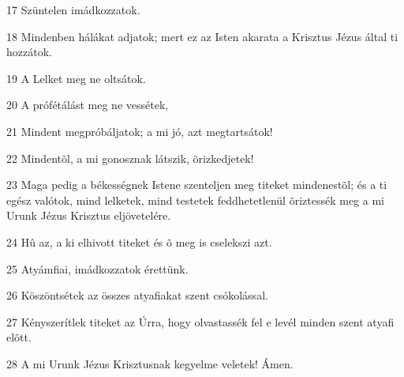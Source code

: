 \par 17 Szüntelen imádkozzatok.
\par 18 Mindenben hálákat adjatok; mert ez az Isten akarata a Krisztus Jézus által ti hozzátok.
\par 19 A Lelket meg ne oltsátok.
\par 20 A prófétálást meg ne vessétek,
\par 21 Mindent megpróbáljatok; a mi jó, azt megtartsátok!
\par 22 Mindentõl, a mi gonosznak látszik, õrizkedjetek!
\par 23 Maga pedig a békességnek Istene szenteljen meg titeket mindenestõl; és a ti egész valótok, mind lelketek, mind testetek feddhetetlenül õriztessék meg a mi Urunk Jézus Krisztus eljövetelére.
\par 24 Hû az, a ki elhivott titeket és õ meg is cselekszi azt.
\par 25 Atyámfiai, imádkozzatok érettünk.
\par 26 Köszöntsétek az összes atyafiakat szent csókolással.
\par 27 Kényszerítlek titeket az Úrra, hogy olvastassék fel e levél minden szent atyafi elõtt.
\par 28 A mi Urunk Jézus Krisztusnak kegyelme veletek! Ámen.


